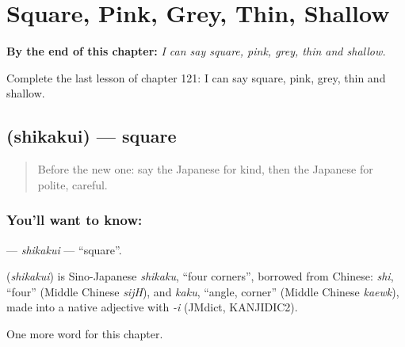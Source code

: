 
\chapter{Square, Pink, Grey, Thin, Shallow}
\label{ch:ja-square-pink-grey-thin-shallow}

\begin{chapteropening}
\textbf{By the end of this chapter:} \emph{I can say square, pink, grey, thin and shallow.}

Complete the last lesson of chapter 121: I can say square, pink, grey, thin and shallow.
\end{chapteropening}

\section[\texorpdfstring{\ja{しかくい} (shikakui)}{しかくい (shikakui)}]{ (shikakui) — square}

\label{lesson:JA-C121-shikakui}



\begin{quote}
Before the new one: say the Japanese for kind, then the Japanese for polite, careful.
\end{quote}

\subsection*{You'll want to know: }
\textbf{} — \emph{shikakui} — \textquotedblleft{}square\textquotedblright{}.

\begin{cousinweb}
\textbf{} (\emph{shikakui}) is Sino-Japanese \emph{shikaku}, \textquotedblleft{}four corners\textquotedblright{}, borrowed from Chinese: \emph{shi}, \textquotedblleft{}four\textquotedblright{} (Middle Chinese \emph{sijH}), and \emph{kaku}, \textquotedblleft{}angle, corner\textquotedblright{} (Middle Chinese \emph{kaewk}), made into a native adjective with \emph{-i} (JMdict, KANJIDIC2).
\end{cousinweb}

\begin{grammarlens}[title={What you've built}]
One more word for this chapter.
\end{grammarlens}

